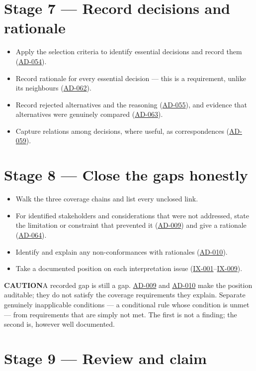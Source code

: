 \documentclass[11pt,a4paper]{report}
\newcommand{\calloutlead}[2]{{\sffamily\bfseries\footnotesize\color{#1}#2\quad}}
\newcommand{\risknote}[1]{\begin{riskbox}\calloutlead{brick}{CAUTION}#1\end{riskbox}}
\newcommand{\rref}[1]{\hyperref[rule:#1]{\textsf{\small #1}}}
\begin{document}
\section{Stage 7 --- Record decisions and rationale}

\begin{itemize}
  \item Apply the selection criteria to identify essential decisions and record
        them (\rref{AD-054}).
  \item Record rationale for every essential decision --- this is a requirement,
        unlike its neighbours (\rref{AD-062}).
  \item Record rejected alternatives and the reasoning
        (\rref{AD-055}), and evidence that alternatives were
        genuinely compared (\rref{AD-063}).
  \item Capture relations among decisions, where useful, as correspondences
        (\rref{AD-059}).
\end{itemize}

\section{Stage 8 --- Close the gaps honestly}

\begin{itemize}
  \item Walk the three coverage chains and list every unclosed link.
  \item For identified stakeholders and considerations that were not addressed,
        state the limitation or constraint that prevented it
        (\rref{AD-009}) and give a rationale
        (\rref{AD-064}).
  \item Identify and explain any non-conformances with rationales
        (\rref{AD-010}).
  \item Take a documented position on each interpretation issue
        (\rref{IX-001}--\rref{IX-009}).
\end{itemize}

\risknote{A recorded gap is still a gap. \rref{AD-009} and
\rref{AD-010} make the position auditable; they do not satisfy
the coverage requirements they explain. Separate genuinely inapplicable
conditions --- a conditional rule whose condition is unmet --- from requirements
that are simply not met. The first is not a finding; the second is, however well
documented.}

\section{Stage 9 --- Review and claim}
\end{document}
